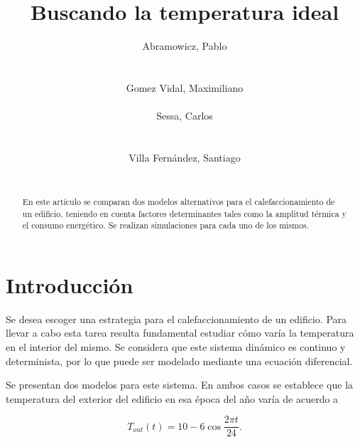 \documentclass{sig-alternate}
\begin{document}
\title{Buscando la temperatura ideal}


\author{
    \alignauthor
    Abramowicz, Pablo\\
     \\
    \ \\
    Gomez Vidal, Maximiliano\\
     \\
    \alignauthor
    Sessa, Carlos\\
     \\
    \ \\
    Villa Fern\'{a}ndez, Santiago\\
     \\
}

\maketitle

\begin{abstract}
En este art\'{i}culo se comparan dos modelos alternativos para el 
calefaccionamiento de un edificio, teniendo en cuenta fac\-to\-res determinantes 
tales como la amplitud t\'{e}rmica y el consumo energ\'{e}tico. Se realizan 
simulaciones para cada uno de los mismos.
\end{abstract}


\section{Introducci\'{o}n}\label{introduccion}

Se desea escoger una estrategia para el calefaccionamiento de un
edificio. Para llevar a cabo esta tarea resulta fundamental estudiar c\'{o}mo 
var\'{i}a la temperatura en el interior del mismo. Se considera que este sistema 
din\'{a}mico es continuo y determinista, por lo que puede ser modelado mediante 
una ecuaci\'{o}n diferencial.

Se presentan dos modelos para este sistema. En ambos casos se establece que
la temperatura del exterior del edificio en esa \'{e}poca del a\~{n}o
var\'{i}a de acuerdo a 

\begin{equation}
\label{t_exterior}
T_{out} (t) = 10 - 6 \cos\frac{2 \pi t}{24}.
\end{equation}
\end{document}
